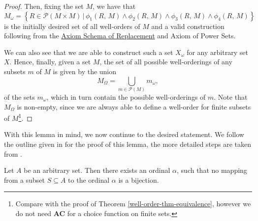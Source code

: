 \documentclass[../../main.tex]{subfiles}
\begin{document}
\begin{proof}
    Then, fixing the set $M$, we have that
    $$M_\omega = \left\{R \in \mathcal{P}(M \times M) \,\vert\, \phi_1(R,\, M) \wedge \phi_2(R,\, M) \wedge \phi_3(R,\, M) \wedge \phi_4(R,\, M)\right\}$$
    is the initially desired set of all well-orders of $M$ and a valid construction following from the \hyperref[ZF3]{Axiom Schema of Replacement} and Axiom of Power Sets.
    
    We can also see that we are able to construct such a set $X_\omega$ for any arbitrary set $X$.
    Hence, finally, given a set $M$, the set of all possible well-orderings of any subsets $m$ of $M$ is given by the union
    $$M_\Omega = \bigcup_{m \in \mathcal{P}(M)} m_\omega,$$
    of the sets $m_\omega$, which in turn contain the possible well-orderings of $m$.
    Note that $M_\Omega$ is non-empty, since we are always able to define a well-order for finite subsets of $M$\footnote{
        Compare with the proof of Theorem \ref{well-order-thm-equivalence}, however we do not need \textbf{AC} for a choice function on finite sets.
    }.
\end{proof}

With this lemma in mind, we now continue to the desired statement.
We follow the outline given in \cite{Haj72} for the proof of this lemma, the more detailed steps are taken from \cite{Har15}.

\begin{lemma}\label{hartogs-lemma}\cite{Har15}\cite[Lemma]{Haj72}
    Let $A$ be an arbitrary set.
    Then there exists an ordinal $\alpha$, such that no mapping from a subset $S \subseteq A$ to the ordinal $\alpha$ is a bijection.
\end{lemma}
\end{document}
